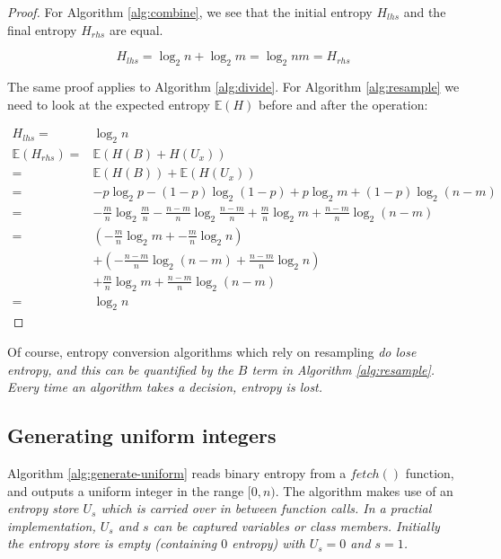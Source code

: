 \documentclass[12pt]{article}
\begin{document}
\begin{proof}
For Algorithm \ref{alg:combine}, we see that the initial entropy $H_{lhs}$ and the final entropy $H_{rhs}$ are equal.

\begin{equation}
H_{lhs} = \log_2n + \log_2m = \log_2nm = H_{rhs}
\end{equation}

The same proof applies to Algorithm \ref{alg:divide}. For Algorithm \ref{alg:resample} we need to look at the expected entropy $\mathbb{E}(H)$ before and after the operation:

\begin{align}
H_{lhs}             = &\log_2n \\
\mathbb{E}(H_{rhs}) = & \mathbb{E}(H(B) + H(U_x)) \\
                    = & \mathbb{E}(H(B)) + \mathbb{E}(H(U_x)) \\
                    = & -p\log_2p - (1-p)\log_2(1-p) + p\log_2m + (1-p)\log_2(n-m) \\
                    = & -\frac{m}{n}\log_2\frac{m}{n} - \frac{n-m}{n}\log_2\frac{n-m}{n} + \frac{m}{n}\log_2m + \frac{n-m}{n}\log_2(n-m) \\
                    = &(-\frac{m}{n}\log_2m + -\frac{m}{n}\log_2n) \\
                    & + (- \frac{n-m}{n}\log_2(n-m) + \frac{n-m}{n}\log_2n)\\
                    &+ \frac{m}{n}\log_2m + \frac{n-m}{n}\log_2(n-m) \\
                     = & \log_2n
\end{align}

\end{proof}

Of course, entropy conversion algorithms which rely on resampling \em do \em lose entropy, and this can be quantified by the $B$ term in Algorithm \ref{alg:resample}. Every time an algorithm takes a decision, entropy is lost.

\subsection{Generating uniform integers}

Algorithm \ref{alg:generate-uniform} reads binary entropy from a $fetch()$ function, and outputs a uniform integer in the range $[0,n)$. The algorithm makes use of an \em entropy store \em $U_s$ which is carried over in between function calls. In a practial implementation, $U_s$ and $s$ can be captured variables or class members. Initially the entropy store is empty (containing $0$ entropy) with $U_s = 0$ and $s=1$.
\end{document}
